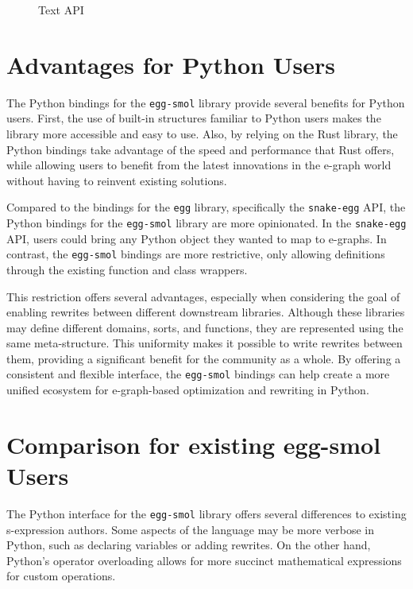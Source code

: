 \documentclass[sigplan,screen,review]{acmart}
\begin{document}
\begin{figure}
   
   \caption{Text API}
   \label{fig:egg-smol}
\end{figure}




\section{Advantages for Python Users}
The Python bindings for the \verb|egg-smol| library provide several benefits for Python users. First, the use of built-in structures familiar to Python users makes the library more accessible and easy to use. Also, by relying on the Rust library, the Python bindings take advantage of the speed and performance that Rust offers, while allowing users to benefit from the latest innovations in the e-graph world without having to reinvent existing solutions.

Compared to the bindings for the \verb|egg| library, specifically the \verb|snake-egg| API, the Python bindings for the \verb|egg-smol| library are more opinionated. In the \verb|snake-egg| API, users could bring any Python object they wanted to map to e-graphs. In contrast, the \verb|egg-smol| bindings are more restrictive, only allowing definitions through the existing function and class wrappers.

This restriction offers several advantages, especially when considering the goal of enabling rewrites between different downstream libraries. Although these libraries may define different domains, sorts, and functions, they are represented using the same meta-structure. This uniformity makes it possible to write rewrites between them, providing a significant benefit for the community as a whole. By offering a consistent and flexible interface, the \verb|egg-smol| bindings can help create a more unified ecosystem for e-graph-based optimization and rewriting in Python.

\section{Comparison for existing egg-smol Users}
The Python interface for the \verb|egg-smol| library offers several differences to existing s-expression authors. Some aspects of the language may be more verbose in Python, such as declaring variables or adding rewrites. On the other hand, Python's operator overloading allows for more succinct mathematical expressions for custom operations.
\end{document}

